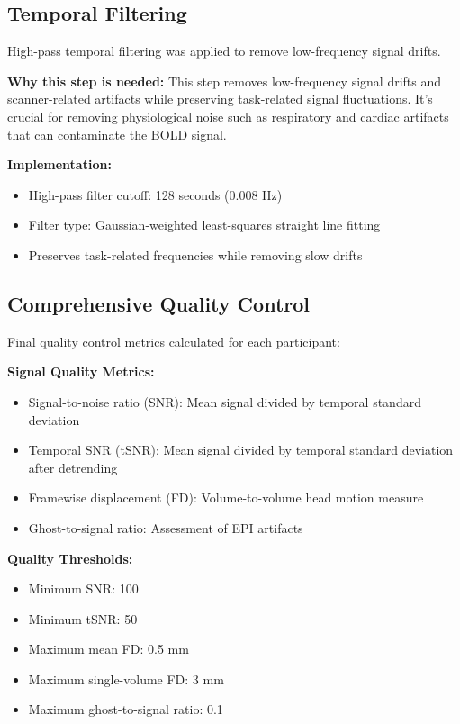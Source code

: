 \documentclass[12pt, a4paper]{article}
\begin{document}
\subsection{Temporal Filtering}
High-pass temporal filtering was applied to remove low-frequency signal drifts.

\vspace{0.5\baselineskip}
\noindent
\textbf{Why this step is needed:} This step removes low-frequency signal drifts and scanner-related artifacts while preserving task-related signal fluctuations. It's crucial for removing physiological noise such as respiratory and cardiac artifacts that can contaminate the BOLD signal.

\noindent
\textbf{Implementation:}
\begin{itemize}
\item High-pass filter cutoff: 128 seconds (0.008 Hz)
\item Filter type: Gaussian-weighted least-squares straight line fitting
\item Preserves task-related frequencies while removing slow drifts
\end{itemize}


\subsection{Comprehensive Quality Control}
Final quality control metrics calculated for each participant:

\vspace{0.5\baselineskip}
\noindent
\textbf{Signal Quality Metrics:} 
\begin{itemize}
\item Signal-to-noise ratio (SNR): Mean signal divided by temporal standard deviation
\item Temporal SNR (tSNR): Mean signal divided by temporal standard deviation after detrending
\item Framewise displacement (FD): Volume-to-volume head motion measure
\item Ghost-to-signal ratio: Assessment of EPI artifacts
\end{itemize}

\noindent
\textbf{Quality Thresholds:}
\begin{itemize}
\item Minimum SNR: 100
\item Minimum tSNR: 50
\item Maximum mean FD: 0.5 mm
\item Maximum single-volume FD: 3 mm
\item Maximum ghost-to-signal ratio: 0.1
\end{itemize}
\end{document}
